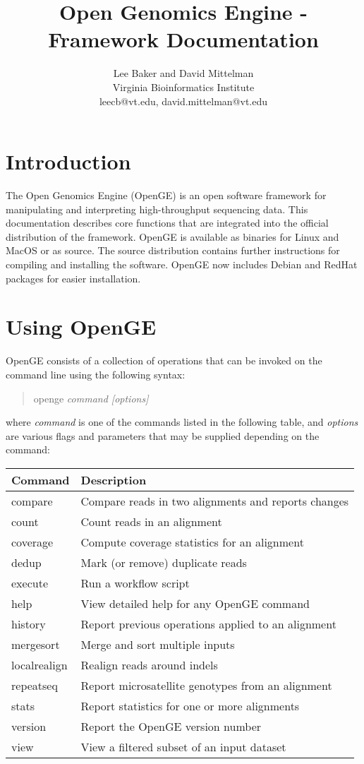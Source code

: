 \documentclass[11pt]{article}
\newcommand {\cmd}[1] {\begin{quote}#1\end{quote}}
\begin{document}
\title{Open Genomics Engine - Framework Documentation}
\author{Lee Baker and David Mittelman\\
Virginia Bioinformatics Institute \\
leecb@vt.edu, david.mittelman@vt.edu}
\maketitle

\setcounter{tocdepth}{2}
\tableofcontents

\section {Introduction}
The Open Genomics Engine (OpenGE) is an open software framework for manipulating and interpreting high-throughput sequencing data. This documentation describes core functions that are integrated into the official distribution of the framework. OpenGE is available as binaries for Linux and MacOS or as source. The source distribution contains further instructions for compiling and installing the software. OpenGE now includes Debian and RedHat packages for easier installation.

\section {Using OpenGE}
OpenGE consists of a collection of operations that can be invoked on the command line using the following syntax:

\cmd{openge \textit{command [options]}}

where \textit{command} is one of the commands listed in the following table, and \textit{options} are various flags and parameters that may be supplied depending on the command:

\begin{center}
\begin{tabular}{lp{3.5in}}
\hline
Command&Description\\ \hline
compare&Compare reads in two alignments and reports changes\\
count&Count reads in an alignment\\
coverage&Compute coverage statistics for an alignment\\
dedup&Mark (or remove) duplicate reads\\
execute&Run a workflow script\\
help&View detailed help for any OpenGE command\\
history&Report previous operations applied to an alignment\\
mergesort&Merge and sort multiple inputs\\
localrealign&Realign reads around indels\\
repeatseq&Report microsatellite genotypes from an alignment\\
stats&Report statistics for one or more alignments\\
version&Report the OpenGE version number\\
view&View a filtered subset of an input dataset\\
\end{tabular}
\end{center}
\end{document}
